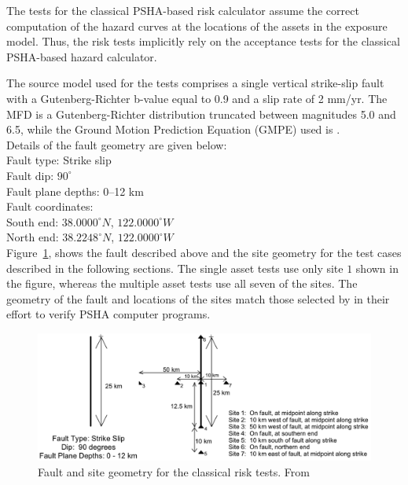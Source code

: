 The tests for the classical PSHA-based risk calculator assume the correct computation of the hazard curves at the locations of the assets in the exposure model. Thus, the risk tests implicitly rely on the acceptance tests for the classical PSHA-based hazard calculator.

The source model used for the tests comprises a single vertical strike-slip fault with a Gutenberg-Richter b-value equal to 0.9 and a slip rate of 2 mm/yr. The MFD is a Gutenberg-Richter distribution truncated between magnitudes 5.0 and 6.5, while the Ground Motion Prediction Equation (GMPE) used is \citet{boore2008}.\\

\noindent Details of the fault geometry are given below:\\

\noindent
Fault type: Strike slip\\
Fault dip: $90^{\circ}$\\
Fault plane depths: 0--12 km\\
Fault coordinates:\\
South end: $38.0000^{\circ} N$, $122.0000^{\circ} W$\\
North end: $38.2248^{\circ} N$, $122.0000^{\circ} W$\\

Figure~\ref{fig:fault-sites}, shows the fault described above and the site geometry for the test cases described in the following sections. The single asset tests use only site $1$ shown in the figure, whereas the multiple asset tests use all seven of the sites. The geometry of the fault and locations of the sites match those selected by \citet{thomas2010} in their effort to verify PSHA computer programs.

\begin{figure}[htbp]
\centering
\includegraphics[width=12cm]{qareport/figures/fig-fault-sites}
\caption{Fault and site geometry for the classical risk tests. From \citet{thomas2010}}
\label{fig:fault-sites}
\end{figure}


